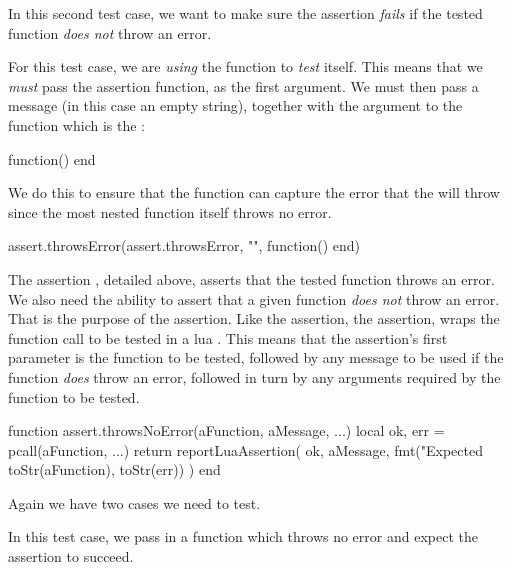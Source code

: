 
In this second test case, we want to make sure the assertion \emph{fails} 
if the tested function \emph{does not} throw an error.

For this test case, we are \emph{using} the  
function to \emph{test} itself. This means that we \emph{must} pass the 
assertion function,  as the first argument. We 
must then pass a message (in this case an empty string), together with the 
argument to the   function which is 
the : 

\starttyping[option=lua]
function() end
\stoptyping

\noindent We do this to ensure that the  
 function can capture the error that the 
  will throw since the most 
 nested function itself throws no error. 

\startLuaTest
  assert.throwsError(assert.throwsError, "", function() end)
\stopLuaTest
\stopTestCase

\stopTestSuite



The assertion , detailed above, asserts that the 
tested function throws an error. We also need the ability to assert that a 
given function \emph{does not} throw an error. That is the purpose of the 
 assertion. Like the  
assertion, the  assertion, wraps the function 
call to be tested in a lua . This means that the 
 assertion's first parameter is the function to 
be tested, followed by any message to be used if the function \emph{does} 
throw an error, followed in turn by any arguments required by the function 
to be tested. 

\startLuaCode
function assert.throwsNoError(aFunction, aMessage, ...)
  local ok, err = pcall(aFunction, ...)
  return reportLuaAssertion(
    ok,
    aMessage,
    fmt("Expected %
      toStr(aFunction), toStr(err))
  )
end
\stopLuaCode

Again we have two cases we need to test.


In this test case, we pass in a function which throws no error and expect 
the assertion to succeed. 

